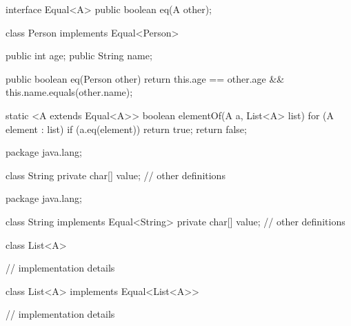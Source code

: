 \documentclass[usenames,dvipsnames,svgnames,table,aspectratio=169,mathserif]{beamer}
\begin{document}
\begin{frame}[fragile]
\begin{javacode}
interface Equal<A> {
  public boolean eq(A other);
}
\end{javacode}

\pause

\begin{javacode}
class Person implements Equal<Person> {
  public int age;
  public String name;

  public boolean eq(Person other) {
    return this.age == other.age && this.name.equals(other.name);
  }
}
\end{javacode}
\end{frame}


\begin{frame}[fragile]
\begin{javacode}
static <A extends Equal<A>> boolean elementOf(A a, List<A> list) {
  for (A element : list) {
    if (a.eq(element)) return true;
  }
  return false;
}
\end{javacode}

\end{frame}


\begin{frame}[fragile]
\begin{javacode}
package java.lang;

class String {
  private char[] value;
  // other definitions
}
\end{javacode}
\end{frame}


\begin{frame}[fragile]
\begin{javacode}
package java.lang;

class String implements Equal<String> {
  private char[] value;
  // other definitions
}
\end{javacode}
\end{frame}


\begin{frame}[fragile]
\begin{javacode}
class List<A> {
  // implementation details





}
\end{javacode}
\end{frame}


\begin{frame}[fragile]
\begin{javacode}
class List<A> implements Equal<List<A>> {
  // implementation details





}
\end{javacode}
\end{frame}
\end{document}
